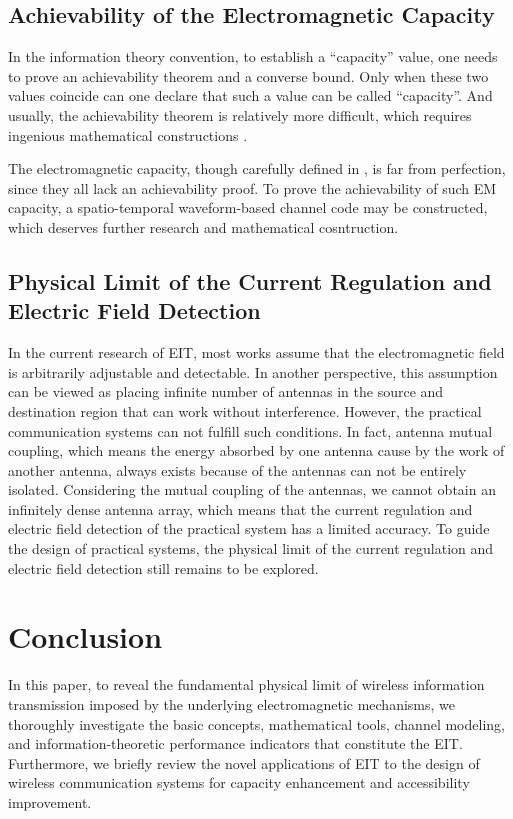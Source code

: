\documentclass[journal,twocolumn]{IEEEtran}
\begin{document}
\subsection{Achievability of the Electromagnetic Capacity}
In the information theory convention, to establish a ``capacity'' value, one needs to prove an achievability theorem and a converse bound. Only when these two values coincide can one declare that such a value can be called ``capacity''. And usually, the achievability theorem is relatively more difficult, which requires ingenious mathematical constructions \cite{shannon1948mathematical}. 

The electromagnetic capacity, though carefully defined in \cite{wan2022mutual,zhang2022pdma}, is far from perfection, since they all lack an achievability proof. 
To prove the achievability of such EM capacity, a spatio-temporal waveform-based channel code may be constructed, which deserves further research and mathematical cosntruction.  

\subsection{Physical Limit of the Current Regulation and Electric Field Detection}
In the current research of EIT, most works assume that the electromagnetic field is arbitrarily adjustable and detectable. In another perspective, this assumption can be viewed as placing infinite number of antennas in the source and destination region that can work without interference. However, the practical communication systems can not fulfill such conditions. In fact, antenna mutual coupling, which means the energy absorbed by one antenna cause by the work of another antenna, always exists because of the antennas can not be entirely isolated. Considering the mutual coupling of the antennas, we cannot obtain an infinitely dense antenna array, which means that the current regulation and electric field detection of the practical system has a limited accuracy. To guide the design of practical systems, the physical limit of the current regulation and electric field detection still remains to be explored. 

\section{Conclusion}
In this paper, to reveal the fundamental physical limit of wireless information transmission imposed by the underlying electromagnetic mechanisms, we thoroughly investigate the basic concepts, mathematical tools, channel modeling, and information-theoretic performance indicators that constitute the EIT. 
Furthermore, we briefly review the novel applications of EIT to the design of wireless communication systems for capacity enhancement and accessibility improvement. 
\end{document}
